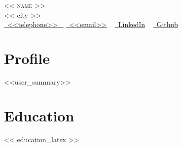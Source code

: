 \documentclass[letterpaper,11pt]{article}
\makeatletter
\newcommand{\resumeSubheading}[4]{
  \vspace{-2pt}\item
    \begin{tabular*}{1.0\textwidth}[t]{l@{\extracolsep{\fill}}r}
      \textbf{\large#1} & \textbf{\small #2} \\
      \textit{\large#3} & \textit{\small #4} \\
     
    \end{tabular*}\vspace{-7pt}
}
\newcommand{\resumeSubHeadingListStart}{\begin{itemize}[leftmargin=0.0in, label={}]}
\newcommand{\resumeSubHeadingListEnd}{\end{itemize}}
\makeatother
\begin{document}

\begin{center}
    {\Huge \scshape << name >>} \\ \vspace{1pt}
    << city >> \\ \vspace{1pt}
    \small 
    \small \href{<<telephone>>}{ \raisebox{-0.1\height}\faPhone\ \underline{<<telephone>>} ~} 
    \href{<<email>>}{\raisebox{-0.2\height}\faEnvelope\  \underline{<<email>>}} ~
    \href{<<linkedin>>}{\raisebox{-0.2\height}\faLinkedinSquare\ \underline{LinkedIn}}  ~
    \href{<<github>>}{\raisebox{-0.2\height}\faGithub\ \underline{Github}} ~
\end{center}

\section{Profile}
<<user_summary>>



\section*{Education}
<< education_latex >>


\end{document}
